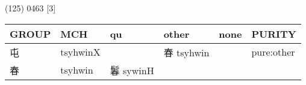 \documentclass[14pt,a4paper]{scrartcl}
\begin{document}
(125) 0463 {[}3{]}

\begin{longtable}[c]{@{}llllll@{}}
\toprule
\begin{minipage}[b]{0.14\columnwidth}\raggedright\strut
GROUP
\strut\end{minipage} &
\begin{minipage}[b]{0.14\columnwidth}\raggedright\strut
MCH
\strut\end{minipage} &
\begin{minipage}[b]{0.14\columnwidth}\raggedright\strut
qu
\strut\end{minipage} &
\begin{minipage}[b]{0.14\columnwidth}\raggedright\strut
other
\strut\end{minipage} &
\begin{minipage}[b]{0.14\columnwidth}\raggedright\strut
none
\strut\end{minipage} &
\begin{minipage}[b]{0.14\columnwidth}\raggedright\strut
PURITY
\strut\end{minipage}\tabularnewline
\midrule
\endhead
\begin{minipage}[t]{0.14\columnwidth}\raggedright\strut
屯
\strut\end{minipage} &
\begin{minipage}[t]{0.14\columnwidth}\raggedright\strut
tsyhwinX
\strut\end{minipage} &
\begin{minipage}[t]{0.14\columnwidth}\raggedright\strut
\strut\end{minipage} &
\begin{minipage}[t]{0.14\columnwidth}\raggedright\strut
春 tsyhwin
\strut\end{minipage} &
\begin{minipage}[t]{0.14\columnwidth}\raggedright\strut
\strut\end{minipage} &
\begin{minipage}[t]{0.14\columnwidth}\raggedright\strut
pure:other
\strut\end{minipage}\tabularnewline
\begin{minipage}[t]{0.14\columnwidth}\raggedright\strut
春
\strut\end{minipage} &
\begin{minipage}[t]{0.14\columnwidth}\raggedright\strut
tsyhwin
\strut\end{minipage} &
\begin{minipage}[t]{0.14\columnwidth}\raggedright\strut
鬊 sywinH
\strut\end{minipage} &

\end{longtable}
\end{document}
